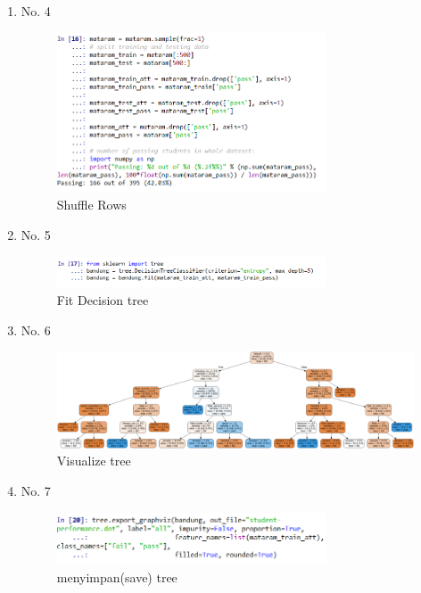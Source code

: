 \begin{enumerate}
\item No. 4
	\hfill\\
	
\begin{figure}[H]
    \includegraphics[width=8cm]{figures/1174084/2/praktek/4.png}
    \centering
    \caption{Shuffle Rows}
\end{figure}

\item No. 5
	\hfill\\
	
\begin{figure}[H]
    \includegraphics[width=8cm]{figures/1174084/2/praktek/5.png}
    \centering
    \caption{Fit Decision tree}
\end{figure}

\item No. 6
	\hfill\\
	
\begin{figure}[H]
    \includegraphics[width=12cm]{figures/1174084/2/praktek/6.png}
    \centering
    \caption{Visualize tree}
\end{figure}

\item No. 7
	\hfill\\
	
\begin{figure}[H]
    \includegraphics[width=8cm]{figures/1174084/2/praktek/7.png}
    \centering
    \caption{menyimpan(save) tree}
\end{figure}


\end{enumerate}
